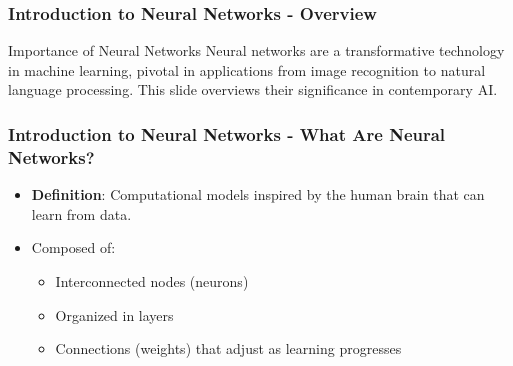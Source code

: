 \documentclass[aspectratio=169]{beamer}
\begin{document}
\frame{\titlepage}

\begin{frame}[fragile]
    \frametitle{Introduction to Neural Networks - Overview}
    \begin{block}{Importance of Neural Networks}
        Neural networks are a transformative technology in machine learning, pivotal in applications from image recognition to natural language processing. This slide overviews their significance in contemporary AI.
    \end{block}
\end{frame}

\begin{frame}[fragile]
    \frametitle{Introduction to Neural Networks - What Are Neural Networks?}
    \begin{itemize}
        \item \textbf{Definition}: Computational models inspired by the human brain that can learn from data.
        \item Composed of:
        \begin{itemize}
            \item Interconnected nodes (neurons)
            \item Organized in layers
            \item Connections (weights) that adjust as learning progresses
        \end{itemize}
    \end{itemize}
\end{frame}
\end{document}
